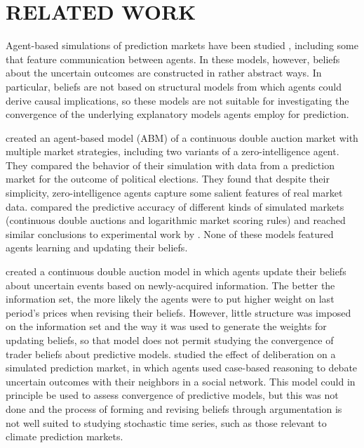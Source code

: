 \documentclass{article}\usepackage[]{graphicx}\usepackage[]{color}
\begin{document}
\section{RELATED WORK}

Agent-based simulations of prediction markets have been studied , including some that feature communication between agents. In these models, however, beliefs about the uncertain outcomes are constructed in rather abstract ways. In particular, beliefs are not based on structural models from which agents could derive causal implications, so these models are not suitable for investigating the convergence of the underlying explanatory models agents employ for prediction.

 created an agent-based model (ABM) of a continuous double auction market with multiple market strategies, including two variants of a zero-intelligence agent. They compared the behavior of their simulation with data from a prediction market for the outcome of political elections. They found that despite their simplicity, zero-intelligence agents capture some salient features of real market data.  compared the predictive accuracy of different kinds of simulated markets (continuous double auctions and logarithmic market scoring rules) and reached similar conclusions to experimental work by . None of these models featured agents learning and updating their beliefs.

 created a continuous double auction model in which agents update their beliefs about uncertain events based on newly-acquired information. The better the information set, the more likely the agents were to put higher weight on last period's prices when revising their beliefs. However, little structure was imposed on the information set and the way it was used to generate the weights for updating beliefs, so that model does not permit studying the convergence of trader beliefs about predictive models.  studied the effect of deliberation on a simulated prediction market, in which agents used case-based reasoning  to debate uncertain outcomes with their neighbors in a social network. This model could in principle be used to assess convergence of predictive models, but this was not done and the process of forming and revising beliefs through argumentation is not well suited to studying stochastic time series, such as those relevant to climate prediction markets.
\end{document}
